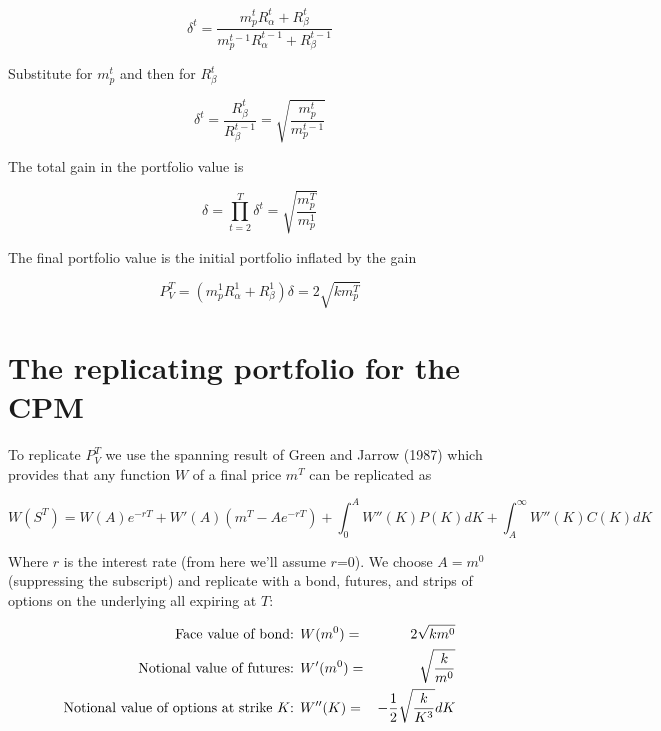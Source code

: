 \documentclass[12pt]{article}
\begin{document}
\begin{equation*}
\delta^t= \frac{m_p^t R_\alpha^t + R_\beta^t }{m_p^{t-1} R_\alpha^{t-1} + R_\beta^{t-1}} 
\end{equation*}

Substitute for $m_p^t$ and then for $R_\beta^t$

\begin{equation*}
\delta^t= \frac{R_\beta^t }{R_\beta^{t-1}} = \sqrt{\frac{m_p^t}{m_p^{t-1}}}
\end{equation*}


The total gain in the portfolio value is

\begin{equation*}
\delta = \prod_{t=2}^T \delta^t  = \sqrt{\frac{m_p^T}{m_p^1}}
\end{equation*}


The final portfolio value is the initial portfolio inflated by the gain

\begin{equation*}
P_V^T = (m_p^1 R_\alpha^1 + R_\beta^1) \delta = 2 \sqrt{km_p^T}
\end{equation*}


\section{The replicating portfolio for the CPM}

To replicate $P_V^T$ we use the spanning result of Green and Jarrow (1987) which provides that any function $W$ of a final price $m^T$ can be replicated as

\begin{equation} \label{SpanningResult}
W(S^T) = W(A)e^{-rT} + W'(A)(m^T -Ae^{-rT}) + \int_0^A W''(K) P(K) dK +   \int_A^\infty W''(K) C(K) dK
\end{equation}

Where $r$ is the interest rate (from here we'll assume $r$=0). We choose $A = m^0$ (suppressing the subscript) and replicate with a bond, futures, and strips of options on the underlying all expiring at $T$:

\begin{eqnarray*}
\hbox{Face value of bond:   }&  W(m^0) =& 2 \sqrt{km^0}\\
\hbox{Notional value of futures:   }& W'(m^0) =& \sqrt{\frac{k}{m^0}}\\
\hbox{Notional value of options at strike $K$:   }& W''(K) =& -  \frac{1}{2} \sqrt{\frac{ k}{K^3}} dK
\end{eqnarray*}
\end{document}
